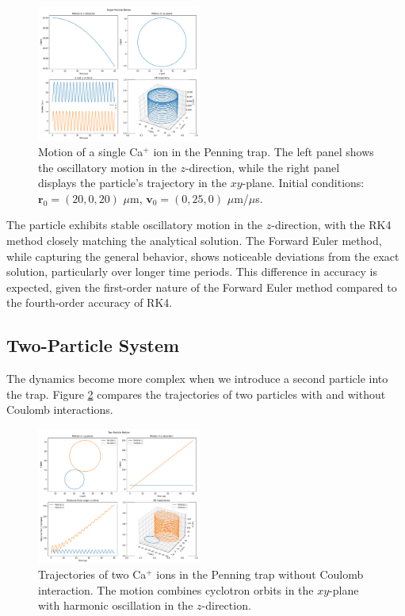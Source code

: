 \documentclass[english,notitlepage,reprint,nofootinbib]{revtex4-2}  %
\begin{document}
\begin{figure}[h!]
    \centering
    \includegraphics[width=0.48\textwidth]{build/figures/single_particle_motion.pdf}
    \caption{Motion of a single Ca$^+$ ion in the Penning trap. The left panel shows the oscillatory motion in the $z$-direction, while the right panel displays the particle's trajectory in the $xy$-plane. Initial conditions: $\mathbf{r}_0 = (20,0,20)$ $\mu$m, $\mathbf{v}_0 = (0,25,0)$ $\mu$m/$\mu$s.}
    \label{fig:single_particle}
\end{figure}

The particle exhibits stable oscillatory motion in the $z$-direction, with the RK4 method closely matching the analytical solution. The Forward Euler method, while capturing the general behavior, shows noticeable deviations from the exact solution, particularly over longer time periods. This difference in accuracy is expected, given the first-order nature of the Forward Euler method compared to the fourth-order accuracy of RK4.

\subsection{Two-Particle System}

The dynamics become more complex when we introduce a second particle into the trap. Figure \ref{fig:two_particles} compares the trajectories of two particles with and without Coulomb interactions.

\begin{figure}[h!]
    \centering
    \includegraphics[width=0.48\textwidth]{build/figures/two_particles_motion_two_particles_without_interaction.pdf}
    \caption{Trajectories of two Ca$^+$ ions in the Penning trap without Coulomb interaction. The motion combines cyclotron orbits in the $xy$-plane with harmonic oscillation in the $z$-direction.}
    \label{fig:two_particles}
\end{figure}
\end{document}
